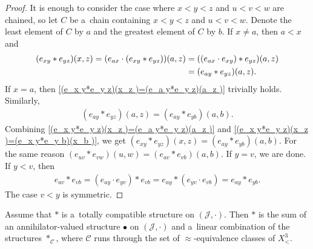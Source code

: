 \documentclass{jonasart}
\newcommand{\bl}{\bullet}
\newcommand{\C}{\mathcal{C}}
\newcommand{\J}{\mathcal{J}}
\begin{document}
	\begin{proof}
		It is enough to consider the case where $x<y<z$ and $u<v<w$ are chained, so let $C$ be a~chain containing $x<y<z$ and $u<v<w$. Denote the least element of $C$ by $a$ and the greatest element of $C$ by $b$. If $x\ne a$, then $a<x$ and
		\begin{align}\label{(e_x y*e_y z)(x_z )=(e_a y*e_y z)(a_z )}
			(e_{xy}*e_{yz})(x,z)=(e_{ax}\cdot(e_{xy}*e_{yz}))(a,z)&=((e_{ax}\cdot e_{xy})*e_{yz})(a,z)\notag\\
			&=(e_{ay}*e_{yz})(a,z).
		\end{align}
		If $x=a$, then \eqref{(e_x y*e_y z)(x_z )=(e_a y*e_y z)(a_z )} trivially holds. Similarly,
		\begin{align}\label{(e_x y*e_y z)(x_z )=(e_x y*e_y b)(x_b )}
			(e_{ay}*e_{yz})(a,z)=(e_{ay}*e_{yb})(a,b).
		\end{align}
		Combining \eqref{(e_x y*e_y z)(x_z )=(e_a y*e_y z)(a_z )} and \eqref{(e_x y*e_y z)(x_z )=(e_x y*e_y b)(x_b )}, we get
		$
		(e_{xy}*e_{yz})(x,z)=(e_{ay}*e_{yb})(a,b).
		$
		For the same reason $(e_{uv}*e_{vw})(u,w)=(e_{av}*e_{vb})(a,b)$. If $y=v$, we are done. If $y<v$, then
		\begin{align*}
			e_{av}*e_{vb}=(e_{ay}\cdot e_{yv})*e_{vb}=e_{ay}*(e_{yv}\cdot e_{vb})=e_{ay}*e_{yb}.
		\end{align*}
		The case $v<y$ is symmetric.
	\end{proof}

	\begin{proposition}\label{tot-comp-bl+lin-comb-*_C}
		Assume that $*$ is a~totally compatible structure on $(\J,\cdot)$. Then $*$ is the sum of an annihilator-valued structure $\bl$ on $(\J,\cdot)$ and a~linear combination of the structures $*_\C$, where $\C$ runs through the set of $\approx$-equivalence classes of $X^3_<$.
	\end{proposition}
\end{document}
